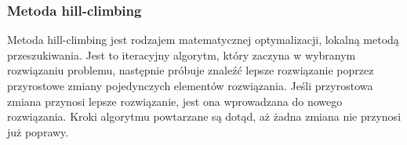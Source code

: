 \subsubsection{Metoda hill-climbing}
Metoda hill-climbing jest rodzajem matematycznej optymalizacji, lokalną metodą przeszukiwania.
Jest to iteracyjny algorytm, który zaczyna w wybranym rozwiązaniu problemu, następnie próbuje znaleźć lepsze rozwiązanie poprzez przyrostowe zmiany pojedynczych elementów rozwiązania.
Jeśli przyrostowa zmiana przynosi lepsze rozwiązanie, jest ona wprowadzana do nowego rozwiązania.
Kroki algorytmu powtarzane są dotąd, aż żadna zmiana nie przynosi już poprawy.

